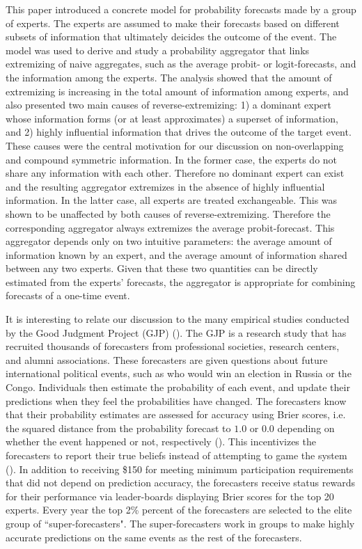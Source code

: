 \documentclass[11pt]{article}
\theoremstyle{definition}
\theoremstyle{definition}
\begin{document}
This paper introduced a concrete model for probability forecasts made by a group of experts. The experts are assumed to make their forecasts based on different subsets of information that ultimately deicides the outcome of the event. The model was used to derive and study a probability aggregator that links extremizing of naive aggregates, such as the average probit- or logit-forecasts, and the information among the experts. The analysis showed that the amount of extremizing is increasing in the total amount of information among experts, and also presented two main causes of reverse-extremizing: 1) a dominant expert whose information forms (or at least approximates) a superset of information, and 2) highly influential information that drives the outcome of the target event. These causes were the central motivation for our discussion on non-overlapping and compound symmetric information. In the former case, the experts do not share any information with each other. Therefore no dominant expert can exist and the resulting aggregator extremizes in the absence of highly influential information. In the latter case, all experts are treated exchangeable.  This was shown to be unaffected by both causes of reverse-extremizing. Therefore the corresponding aggregator always extremizes the average probit-forecast. This aggregator depends only on two intuitive parameters: the average amount of information known by an expert, and the average amount of information shared between any two experts. Given that these two quantities can be directly estimated from the experts' forecasts, the aggregator is appropriate for combining forecasts of a one-time event. 

It is interesting to relate our discussion to the many empirical studies conducted by the Good Judgment Project (GJP) (\cite{mellers2014psychological, ungar2012good}). The GJP is a research study that has recruited thousands of forecasters from professional societies, research centers, and alumni associations. These forecasters are given questions about future international political events, such as who would win an election in Russia or the Congo. Individuals then estimate the probability of each event, and update their predictions when they feel the probabilities have changed. The forecasters know that their probability estimates are assessed for accuracy using Brier scores, i.e. the squared distance from the  probability forecast to $1.0$ or $0.0$ depending on whether the event happened or not, respectively (\cite{Brier}). This incentivizes the forecasters to report their true beliefs instead of attempting to game the system (\citet{winkler1968good}). In addition to receiving \$150 for meeting minimum participation requirements that did not depend on prediction accuracy, the forecasters receive status rewards for their performance via leader-boards displaying Brier scores for the top 20 experts. Every year the top 2\% percent of the forecasters are selected to the elite group of ``super-forecasters". The super-forecasters work in groups to make highly accurate predictions on the same events as the rest of the forecasters. 
\end{document}
